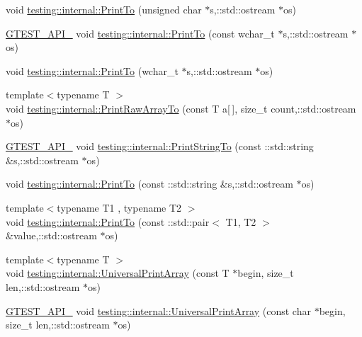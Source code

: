 \begin{DoxyCompactItemize}
\item 
void \hyperlink{namespacetesting_1_1internal_a10f8d85ee591c315557372669c02fbb7}{testing\+::internal\+::\+Print\+To} (unsigned char $\ast$s,\+::std\+::ostream $\ast$os)
\item 
\hyperlink{gtest-port_8h_aa73be6f0ba4a7456180a94904ce17790}{G\+T\+E\+S\+T\+\_\+\+A\+P\+I\+\_\+} void \hyperlink{namespacetesting_1_1internal_a9f0cce661c0cff119402169bb08131fa}{testing\+::internal\+::\+Print\+To} (const wchar\+\_\+t $\ast$s,\+::std\+::ostream $\ast$os)
\item 
void \hyperlink{namespacetesting_1_1internal_a43ae763e7cd5602ebbd9bdc5884203f0}{testing\+::internal\+::\+Print\+To} (wchar\+\_\+t $\ast$s,\+::std\+::ostream $\ast$os)
\item 
{\footnotesize template$<$typename T $>$ }\\void \hyperlink{namespacetesting_1_1internal_aba630c2fa49dd2b4bce3de24e70aec9f}{testing\+::internal\+::\+Print\+Raw\+Array\+To} (const T a\mbox{[}$\,$\mbox{]}, size\+\_\+t count,\+::std\+::ostream $\ast$os)
\item 
\hyperlink{gtest-port_8h_aa73be6f0ba4a7456180a94904ce17790}{G\+T\+E\+S\+T\+\_\+\+A\+P\+I\+\_\+} void \hyperlink{namespacetesting_1_1internal_a0b11505e1a4527c1f1d8c1c5cdfb71b5}{testing\+::internal\+::\+Print\+String\+To} (const \+::std\+::string \&s,\+::std\+::ostream $\ast$os)
\item 
void \hyperlink{namespacetesting_1_1internal_a1bcff7765fb78cedada8d09f7159ab7e}{testing\+::internal\+::\+Print\+To} (const \+::std\+::string \&s,\+::std\+::ostream $\ast$os)
\item 
{\footnotesize template$<$typename T1 , typename T2 $>$ }\\void \hyperlink{namespacetesting_1_1internal_a5759c5abed8ebab0e1a8a0f8aadab768}{testing\+::internal\+::\+Print\+To} (const \+::std\+::pair$<$ T1, T2 $>$ \&value,\+::std\+::ostream $\ast$os)
\item 
{\footnotesize template$<$typename T $>$ }\\void \hyperlink{namespacetesting_1_1internal_a73b5046a2ed65d0e2fb7cdc9bdaee3fe}{testing\+::internal\+::\+Universal\+Print\+Array} (const T $\ast$begin, size\+\_\+t len,\+::std\+::ostream $\ast$os)
\item 
\hyperlink{gtest-port_8h_aa73be6f0ba4a7456180a94904ce17790}{G\+T\+E\+S\+T\+\_\+\+A\+P\+I\+\_\+} void \hyperlink{namespacetesting_1_1internal_a3fac293aeb6e7e6b3ff3e27404f6588b}{testing\+::internal\+::\+Universal\+Print\+Array} (const char $\ast$begin, size\+\_\+t len,\+::std\+::ostream $\ast$os)

\end{DoxyCompactItemize}
